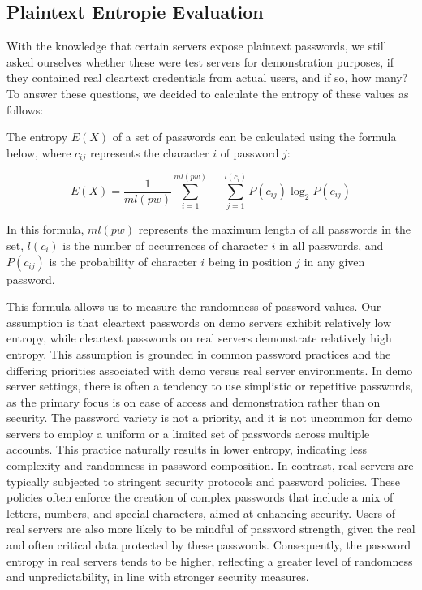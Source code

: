 \subsection{Plaintext Entropie Evaluation}

With the knowledge that certain servers expose plaintext passwords, we still asked ourselves whether these were test servers for demonstration purposes, if they contained real cleartext credentials from actual users, and if so, how many? To answer these questions, we decided to calculate the entropy of these values as follows:

The entropy \( E(X) \) of a set of passwords can be calculated using the formula below, where \( c_{ij} \) represents the character \( i \) of password \( j \):

\[
E(X) = \frac{1}{ml(pw)} \sum_{i=1}^{ml(pw)} -\sum_{j=1}^{l(c_i)} P(c_{ij}) \log_2 P(c_{ij})
\]

In this formula, \( ml(pw) \) represents the maximum length of all passwords in the set, \( l(c_i) \) is the number of occurrences of character \( i \) in all passwords, and \( P(c_{ij}) \) is the probability of character \( i \) being in position \( j \) in any given password.

This formula allows us to measure the randomness of password values. Our assumption is that cleartext passwords on demo servers exhibit relatively low entropy, while cleartext passwords on real servers demonstrate relatively high entropy. This assumption is grounded in common password practices and the differing priorities associated with demo versus real server environments. In demo server settings, there is often a tendency to use simplistic or repetitive passwords, as the primary focus is on ease of access and demonstration rather than on security. The password variety is not a priority, and it is not uncommon for demo servers to employ a uniform or a limited set of passwords across multiple accounts. This practice naturally results in lower entropy, indicating less complexity and randomness in password composition. In contrast, real servers are typically subjected to stringent security protocols and password policies. These policies often enforce the creation of complex passwords that include a mix of letters, numbers, and special characters, aimed at enhancing security. Users of real servers are also more likely to be mindful of password strength, given the real and often critical data protected by these passwords. Consequently, the password entropy in real servers tends to be higher, reflecting a greater level of randomness and unpredictability, in line with stronger security measures.

